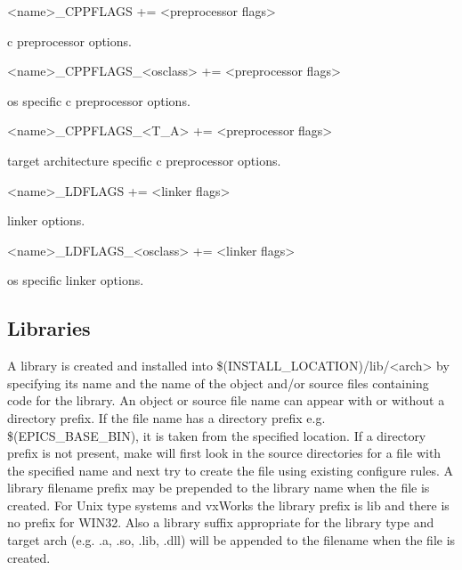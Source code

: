 \begin{description}
\item \textless{}name\textgreater{}\_CPPFLAGS += \textless{}preprocessor flags\textgreater{}

c preprocessor options.

\item \textless{}name\textgreater{}\_CPPFLAGS\_\textless{}osclass\textgreater{} += \textless{}preprocessor flags\textgreater{}

os specific c preprocessor options.

\item \textless{}name\textgreater{}\_CPPFLAGS\_\textless{}T\_A\textgreater{} += \textless{}preprocessor flags\textgreater{}

target architecture specific c preprocessor options.

\item \textless{}name\textgreater{}\_LDFLAGS += \textless{}linker flags\textgreater{}

linker options.

\item \textless{}name\textgreater{}\_LDFLAGS\_\textless{}osclass\textgreater{} += \textless{}linker flags\textgreater{}

os specific linker options.

\end{description}

\subsection{Libraries}

A library is created and installed into \$(INSTALL\_LOCATION)/lib/\textless{}arch\textgreater{} by specifying its name and the name of the 
object and/or source files containing code for the library. An object or source file name can appear with or without a 
directory prefix. If the file name has a directory prefix e.g. \$(EPICS\_BASE\_BIN), it is taken from the specified location. 
If a directory prefix is not present, make will first look in the source directories for a file with the specified name and next 
try to create the file using existing configure rules. A library filename prefix may be prepended to the library name when 
the file is created. For Unix type systems and vxWorks the library prefix is lib and there is no prefix for WIN32. Also a 
library suffix appropriate for the library type and target arch (e.g. .a, .so, .lib, .dll) will be appended to the filename when 
the file is created.

